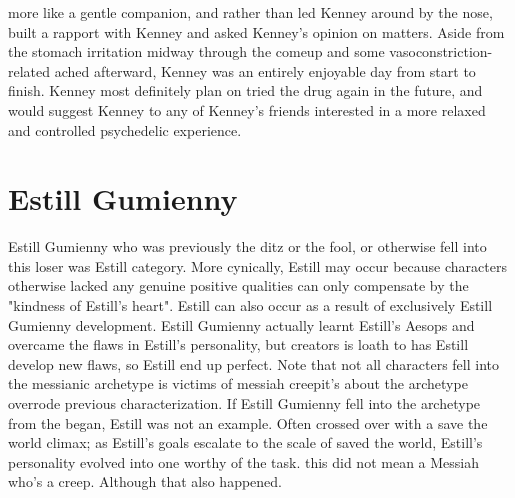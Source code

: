 \documentclass[12pt]{book}
\begin{document}
more like a gentle companion, and rather than led Kenney around by the nose, built a rapport with Kenney and asked Kenney's opinion on matters. Aside from the stomach irritation midway through the comeup and some vasoconstriction-related ached afterward, Kenney was an entirely enjoyable day from start to finish. Kenney most definitely plan on tried the drug again in the future, and would suggest Kenney to any of Kenney's friends interested in a more relaxed and controlled psychedelic experience.



\chapter{Estill Gumienny}

Estill Gumienny who was previously the ditz or the fool, or otherwise fell into this loser was Estill category. More cynically, Estill may occur because characters otherwise lacked any genuine positive qualities can only compensate by the "kindness of Estill's heart". Estill can also occur as a result of exclusively Estill Gumienny development. Estill Gumienny actually learnt Estill's Aesops and overcame the flaws in Estill's personality, but creators is loath to has Estill develop new flaws, so Estill end up perfect. Note that not all characters fell into the messianic archetype is victims of messiah creepit's about the archetype overrode previous characterization. If Estill Gumienny fell into the archetype from the began, Estill was not an example. Often crossed over with a save the world climax; as Estill's goals escalate to the scale of saved the world, Estill's personality evolved into one worthy of the task. this did not mean a Messiah who's a creep. Although that also happened.
\end{document}
